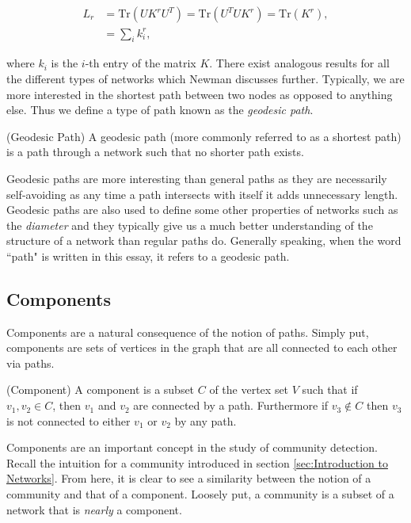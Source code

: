 $$
\begin{aligned}
    L_r &= \text{Tr}(UK^rU^T) = \text{Tr}(U^TUK^r) = \text{Tr}(K^r), \\
    & = \sum_i k_i^r,
\end{aligned}
$$

\noindent
where $k_i$ is the $i$-th entry of the matrix $K$. There exist analogous results for all the different types of networks which Newman discusses further\cite[138]{newman10}. Typically, we are more interested in the shortest path between two nodes as opposed to anything else. Thus we define a type of path known as the \emph{geodesic path}.

\begin{definition}{(Geodesic Path)}
    A geodesic path (more commonly referred to as a shortest path) is a path through a network such that no shorter path exists.
\end{definition}

Geodesic paths are more interesting than general paths as they are necessarily self-avoiding as any time a path intersects with itself it adds unnecessary length. Geodesic paths are also used to define some other properties of networks such as the \emph{diameter} and they typically give us a much better understanding of the structure of a network than regular paths do. Generally speaking, when the word ``path" is written in this essay, it refers to a geodesic path.

\subsection{Components}
Components are a natural consequence of the notion of paths. Simply put, components are sets of vertices in the graph that are all connected to each other via paths.

\begin{definition}{(Component)}
    A component is a subset $C$ of the vertex set $V$ such that if $v_1, v_2 \in C$, then $v_1$ and $v_2$ are connected by a path. Furthermore if $v_3 \not\in C$ then $v_3$ is not connected to either $v_1$ or $v_2$ by any path.
\end{definition}

Components are an important concept in the study of community detection. Recall the intuition for a community introduced in section \ref{sec:Introduction to Networks}. From here, it is clear to see a similarity between the notion of a community and that of a component. Loosely put, a community is a subset of a network that is \emph{nearly} a component.


